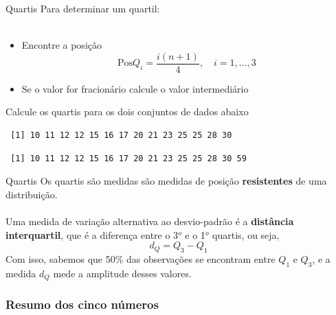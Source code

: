 \documentclass[10pt]{beamer}\usepackage[]{graphicx}\usepackage[]{color}
\makeatletter
\newenvironment{kframe}{%
 \def\at@end@of@kframe{}%
 \ifinner\ifhmode%
  \def\at@end@of@kframe{\end{minipage}}%
  \begin{minipage}{\columnwidth}%
 \fi\fi%
 \def\FrameCommand##1{\hskip\@totalleftmargin \hskip-\fboxsep
 \colorbox{shadecolor}{##1}\hskip-\fboxsep
     \hskip-\linewidth \hskip-\@totalleftmargin \hskip\columnwidth}%
 \MakeFramed {\advance\hsize-\width
   \@totalleftmargin\z@ \linewidth\hsize
   \@setminipage}}%
 {\par\unskip\endMakeFramed%
 \at@end@of@kframe}
\newenvironment{knitrout}{}{} %
\theoremstyle{definition}
\makeatother
\begin{document}
\begin{frame}[fragile]{Quartis}
  Para determinar um quartil: \\~\\
  \begin{itemize}
  \item Encontre a posição
    \begin{equation*}
      \text{Pos} Q_i = \frac{i(n+1)}{4}, \quad i=1,\ldots,3
    \end{equation*}
  \item Se o valor for fracionário calcule o valor intermediário
  \end{itemize}
  \vspace{1em}
  Calcule os quartis para os dois conjuntos de dados abaixo
\begin{knitrout}\footnotesize
{}\color{fgcolor}\begin{kframe}
\begin{verbatim}
 [1] 10 11 12 12 15 16 17 20 21 23 25 25 28 30
\end{verbatim}
\end{kframe}
\end{knitrout}
\begin{knitrout}\footnotesize
{}\color{fgcolor}\begin{kframe}
\begin{verbatim}
 [1] 10 11 12 12 15 16 17 20 21 23 25 25 28 30 59
\end{verbatim}
\end{kframe}
\end{knitrout}

\end{frame}

\begin{frame}{Quartis}
  Os quartis são medidas são medidas de posição \textbf{resistentes} de
  uma distribuição. \\~\\
  Uma medida de variação alternativa ao desvio-padrão é a
  \textbf{distância interquartil}, que é a diferença entre o 3$^o$ e o
  1$^o$ quartis, ou seja,
  \begin{equation*}
    d_Q = Q_3 - Q_1
  \end{equation*}
  Com isso, sabemos que 50\% das observações se encontram entre
  $Q_1$ e $Q_3$, e a medida $d_Q$ mede a amplitude desses valores.
\end{frame}

\subsubsection[Resumo dos 5 números]{Resumo dos cinco números}
\end{document}
